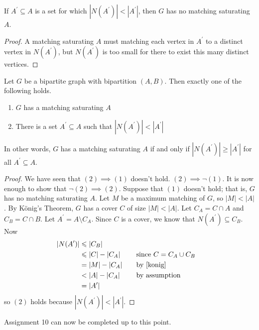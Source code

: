 \begin{thmbox}
    \begin{prop}
        If $ A^\prime\subseteq A $ is a set for which $ |N(A^\prime)|<|A^\prime| $,
        then $ G $ has no matching saturating $ A $.
    \end{prop}
\end{thmbox}
\begin{proof}
    A matching saturating $ A $ must matching each vertex in $ A^\prime $ to a distinct
    vertex in $ N(A^\prime) $, but $ N(A^\prime) $ is too small for there to
    exist this many distinct vertices.
\end{proof}
\begin{thmbox}
    \begin{theorem}
        Let $ G $ be a bipartite graph with bipartition $ (A,B) $. Then exactly one
        of the following holds.
        \begin{enumerate}[(1)]
            \item $ G $ has a matching saturating $ A $
            \item There is a set $ A^\prime \subseteq A $ such that $ |N(A^\prime)|<|A^\prime| $
        \end{enumerate}
        In other words, $ G $ has a matching saturating $ A $ if and only if $ |N(A^\prime)|\geqslant |A^\prime| $
        for all $ A^\prime \subseteq A $.
    \end{theorem}
\end{thmbox}
\begin{proof}
    We have seen that $ (2)\implies (1) $ doesn't hold. $ (2)\implies \lnot (1) $.
    It is now enough to show that $ \lnot(2)\implies (2) $. Suppose that $ (1) $ doesn't hold;
    that is, $ G $ has no matching saturating $ A $. Let $ M $ be a maximum matching of $ G $,
    so $ |M|<|A| $. By König's Theorem, $ G $ has a cover $ C $ of size $ |M|<|A| $.
    Let $ C_A = C\cap A $ and $ C_B = C\cap B $. Let $ A^\prime=A\setminus C_A $. Since
    $ C $ is a cover, we know that $ N(A^\prime)\subseteq C_B $. Now
    \begin{equation*}
        \begin{aligned}
            |N(A^\prime)|
             & \leqslant |C_B|                                          \\
             & \leqslant |C|-|C_A| & \quad & \text{since }C=C_A\cup C_B \\
             & =|M|-|C_A|          &       & \text{by \ref{konig}}      \\
             & < |A|-|C_A|         &       & \text{by assumption}       \\
             & =|A^\prime|
        \end{aligned}
    \end{equation*}
    so $ (2) $ holds because $ |N(A^\prime)|<|A^\prime| $.
\end{proof}
\begin{remark}
    Assignment 10 can now be completed up to this point.
\end{remark}


